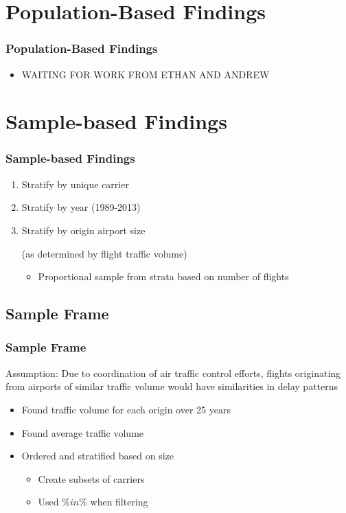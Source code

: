 \documentclass{beamer}
\begin{document}
\section{Population-Based Findings}
\begin{frame}
\frametitle{Population-Based Findings}
\begin{itemize}
\item WAITING FOR WORK FROM ETHAN AND ANDREW
\end{itemize}

\end{frame}

\section{Sample-based Findings}
\begin{frame}
\frametitle{Sample-based Findings}
\begin{enumerate}
\item Stratify by unique carrier
\item Stratify by year (1989-2013)
\item Stratify by origin airport size 

(as determined by flight traffic volume)
\begin{itemize}
\item Proportional sample from strata based on number of flights 
\end{itemize}
\end{enumerate}

\end{frame}

\subsection{Sample Frame}
\begin{frame}
\frametitle{Sample Frame}
Assumption: Due to coordination of air traffic control efforts, flights originating from airports of similar traffic volume would have similarities in delay patterns
\begin{itemize}
\item Found traffic volume for each origin over 25 years 
\item Found average traffic volume 
\item Ordered and stratified based on size
\begin{itemize}
\item Create subsets of carriers 
\item Used $\%in\%$ when filtering
\end{itemize}
\end{itemize}
\end{frame}
\end{document}
